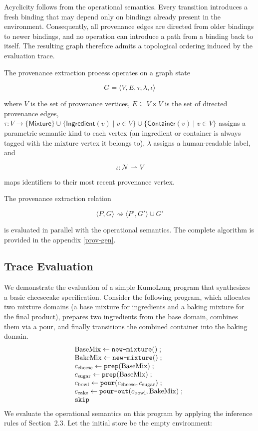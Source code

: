\documentclass[11pt, a4paper]{article}
\begin{document}
Acyclicity follows from the operational semantics. Every transition introduces a fresh binding that may depend only on bindings already present in the environment. Consequently, all provenance edges are directed from older bindings to newer bindings, and no operation can introduce a path from a binding back to itself. The resulting graph therefore admits a topological ordering induced by the evaluation trace.

The provenance extraction process operates on a graph state

\[
G = \langle V,E,\tau,\lambda,\iota\rangle
\]

where $V$ is the set of provenance vertices, $E \subseteq V \times V$
is the set of directed provenance edges, $\tau : V \to \{\mathsf{Mixture}\} \cup \{\mathsf{Ingredient}(v) \mid v \in V\} \cup \{\mathsf{Container}(v) \mid v \in V\}$ assigns a parametric semantic
kind to each vertex (an ingredient or container is always tagged with the mixture vertex it belongs to), $\lambda$ assigns a human-readable label, and

\[
\iota : \mathcal N \rightharpoonup V
\]

maps identifiers to their most recent provenance vertex.

The provenance extraction relation

\[
\langle P,G\rangle \rightsquigarrow \langle P',G'\rangle \cup G'
\]

is evaluated in parallel with the operational semantics. The complete algorithm is provided in the appendix \ref{prov-gen}.

\subsection{Trace Evaluation}
We demonstrate the evaluation of a simple KumoLang program that synthesizes a basic cheesecake specification. Consider the following program, which allocates two mixture domains (a base mixture for ingredients and a baking mixture for the final product), prepares two ingredients from the base domain, combines them via a pour, and finally transitions the combined container into the baking domain. 
\[
\begin{array}{l}
\text{BaseMix} \leftarrow \text{\texttt{new-mixture}}() \;;\; \\
\text{BakeMix} \leftarrow \text{\texttt{new-mixture}}() \;;\; \\
c_{\text{cheese}} \leftarrow \text{\texttt{prep}}(\text{BaseMix}) \;;\; \\
c_{\text{sugar}} \leftarrow \text{\texttt{prep}}(\text{BaseMix}) \;;\; \\
c_{\text{bowl}} \leftarrow \text{\texttt{pour}}(c_{\text{cheese}}, c_{\text{sugar}}) \;;\; \\
c_{\text{cake}} \leftarrow \text{\texttt{pour-out}}(c_{\text{bowl}}, \text{BakeMix}) \;;\; \\
\text{\texttt{skip}}
\end{array}
\]
We evaluate the operational semantics on this program by applying the inference rules of Section~2.3. Let the initial store be the empty environment:
\end{document}
